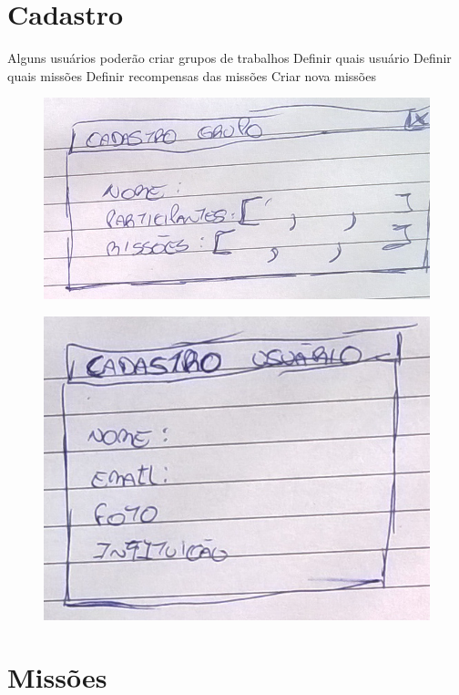 \documentclass[
	12pt,				%
	oneside,			%
	a4paper,			%
	english,			%
	french,				%
	spanish,			%
	brazil,				%
	]{abntex2}
\begin{document}
\section{Cadastro}


Alguns usuários poderão criar grupos de trabalhos
Definir quais usuário
Definir quais missões
Definir recompensas das missões
Criar nova missões

\begin{figure}[ht]
\centering
\includegraphics[width=1\textwidth]{imagens/proposta_cadastro.png}
\end{figure}

\begin{figure}[ht]
\centering
\includegraphics[width=1\textwidth]{imagens/proposta_cadastro_usuario.png}
\end{figure}

\section{Missões}
\end{document}
